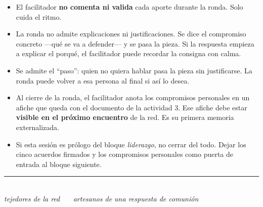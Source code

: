 \documentclass[11pt, a4paper]{article}
\begin{document}
\begin{itemize}
  \item El facilitador \textbf{no comenta ni valida} cada aporte durante la ronda. Solo cuida el ritmo.
  \item La ronda no admite explicaciones ni justificaciones. Se dice el compromiso concreto ---qué se va a defender--- y se pasa la pieza. Si la respuesta empieza a explicar el porqué, el facilitador puede recordar la consigna con calma.
  \item Se admite el ``paso'': quien no quiera hablar pasa la pieza sin justificarse. La ronda puede volver a esa persona al final si así lo desea.
  \item Al cierre de la ronda, el facilitador anota los compromisos personales en un afiche que queda con el documento de la actividad 3. Ese afiche debe estar \textbf{visible en el próximo encuentro} de la red. Es su primera memoria externalizada.
  \item Si esta sesión es prólogo del bloque \emph{liderazgo}, no cerrar del todo. Dejar los cinco acuerdos firmados y los compromisos personales como puerta de entrada al bloque siguiente.
\end{itemize}

\vspace{2em}

\begin{center}
{\color{regla}\rule{0.35\linewidth}{0.5pt}}\\
\vspace{0.6em}
{\color{tenue}\itshape\small tejedores de la red \ \textbullet\ \ artesanos de una respuesta de comunión}
\end{center}
\end{document}

